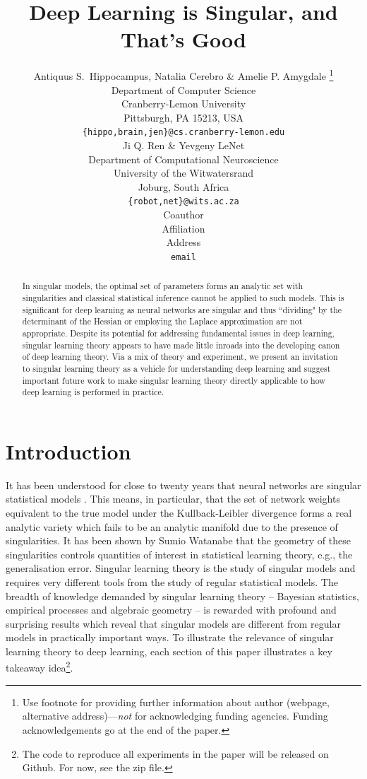 \documentclass{article} %
\title{Deep Learning is Singular, and That's Good}
\author{Antiquus S.~Hippocampus, Natalia Cerebro \& Amelie P. Amygdale \thanks{ Use footnote for providing further information
about author (webpage, alternative address)---\emph{not} for acknowledging
funding agencies.  Funding acknowledgements go at the end of the paper.} \\
Department of Computer Science\\
Cranberry-Lemon University\\
Pittsburgh, PA 15213, USA \\
\texttt{\{hippo,brain,jen\}@cs.cranberry-lemon.edu} \\
\And
Ji Q. Ren \& Yevgeny LeNet \\
Department of Computational Neuroscience \\
University of the Witwatersrand \\
Joburg, South Africa \\
\texttt{\{robot,net\}@wits.ac.za} \\
\AND
Coauthor \\
Affiliation \\
Address \\
\texttt{email}
}
\begin{document}
\maketitle

\begin{abstract}
In singular models, the optimal set of parameters forms an analytic set with singularities and classical statistical inference cannot be applied to such models. This is significant for deep learning as neural networks are singular and thus ``dividing" by the determinant of the Hessian or employing the Laplace approximation are not appropriate. Despite its potential for addressing fundamental issues in deep learning, singular learning theory appears to have made little inroads into the developing canon of deep learning theory. Via a mix of theory and experiment, we present an invitation to singular learning theory as a vehicle for understanding deep learning and suggest important future work to make singular learning theory directly applicable to how deep learning is performed in practice. 
\end{abstract}

\section{Introduction}

It has been understood for close to twenty years that neural networks are singular statistical models \citep{amari_learning_2003, watanabe_almost_2007}. This means, in particular, that the set of network weights equivalent to the true model under the Kullback-Leibler divergence forms a real analytic variety which fails to be an analytic manifold due to the presence of singularities. It has been shown by Sumio Watanabe that the geometry of these singularities controls quantities of interest in statistical learning theory, e.g., the generalisation error. Singular learning theory \citep{watanabe_algebraic_2009} is the study of singular models and requires very different tools from the study of regular statistical models. The breadth of knowledge demanded by singular learning theory -- Bayesian statistics, empirical processes and algebraic geometry -- is rewarded with profound and surprising results which reveal that singular models are different from regular models in practically important ways.
To illustrate the relevance of singular learning theory to deep learning, each section of this paper illustrates a key takeaway idea\footnote{The code to reproduce all experiments in the paper will be released on Github. For now, see the zip file.}. 
\end{document}

